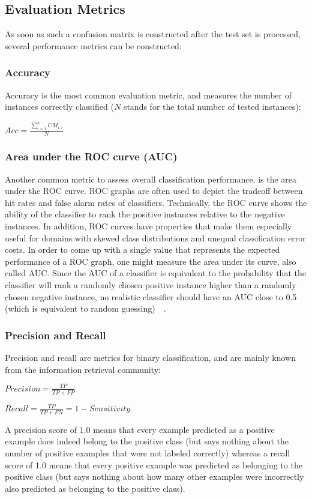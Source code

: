 \newpage
\subsection{Evaluation Metrics}\label{eval-metrics}
As soon as such a confusion matrix is constructed after the test set is processed, several performance metrics can be constructed:

\subsubsection{Accuracy}
Accuracy is the most common evaluation metric, and measures the number of instances correctly classified (\(N\) stands for the total number of tested instances):
\begin{center}\(Acc = \frac{\sum_{i=1}^k{CM_{i,i}}}{N}\)\end{center}

\subsubsection{Area under the ROC curve (AUC)}
Another common metric to assess overall classification performance, is the area under the ROC curve.   ROC graphs are often used to depict the tradeoff between hit rates and false alarm rates of classifiers. Technically, the ROC curve shows the ability of the classifier to rank the positive instances relative to the negative instances.  In addition, ROC curves have properties that make them especially useful for domains with skewed class distributions and unequal classification error costs. In order to come up with a single value that represents the expected performance of a ROC graph, one might measure the area under its curve, also called AUC.  Since the AUC of a classifier is equivalent to the probability that the classifier will rank a randomly chosen positive instance higher than a randomly chosen negative instance, no realistic classifier should have an AUC close to 0.5 (which is equivalent to random guessing)~\cite{roc}~\cite{_miningwith}. 

\subsubsection{Precision and Recall}
Precision and recall are metrics for binary classification, and are mainly known from the information retrieval community:
\begin{center}\(Precision = \frac{TP}{TP+FP}\)\end{center}  
\begin{center}\(Recall = \frac{TP}{TP+FN} = 1 - Sensitivity\)\end{center} 
A precision score of 1.0 means that every example predicted as a positive example does indeed belong to the positive class (but says nothing about the number of positive examples that were not labeled correctly) whereas a recall score of 1.0 means that every positive example was predicted as belonging to the positive class (but says nothing about how many other examples were incorrectly also predicted as belonging to the positive class).

